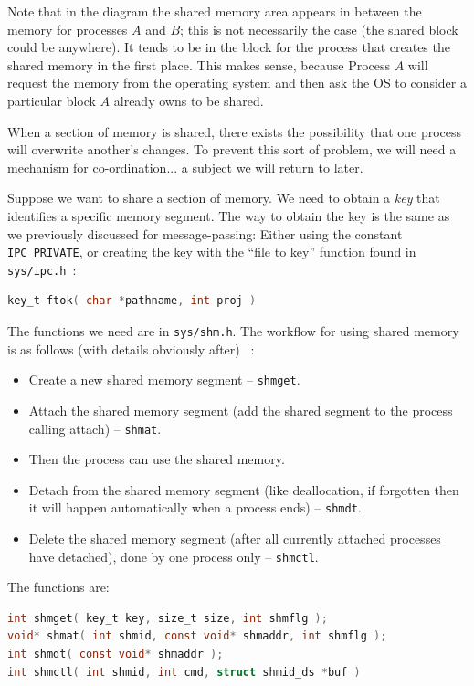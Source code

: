 Note that in the diagram the shared memory area appears in between the memory for processes $A$ and $B$; this is not necessarily the case (the shared block could be anywhere). It tends to be in the block for the process that creates the shared memory in the first place. This makes sense, because Process $A$ will request the memory from the operating system and then ask the OS to consider a particular block $A$ already owns to be shared.

When a section of memory is shared, there exists the possibility that one process will overwrite another's changes. To prevent this sort of problem, we will need a mechanism for co-ordination... a subject we will return to later.

Suppose we want to share a section of memory. We need to obtain a \textit{key} that identifies a specific memory segment. The way to obtain the key is the same as we previously discussed for message-passing: Either using the constant \texttt{IPC\_PRIVATE}, or creating the key with the ``file to key'' function found in \texttt{sys/ipc.h}~\cite{lpi}:
\begin{lstlisting}[language=C]
key_t ftok( char *pathname, int proj )
\end{lstlisting}

The functions we need are in \texttt{sys/shm.h}. The workflow for using shared memory is as follows (with details obviously after) ~\cite{lpi}:
\begin{itemize}
	\item Create a new shared memory segment -- \texttt{shmget}.
	\item Attach the shared memory segment (add the shared segment to the process calling attach) -- \texttt{shmat}.
	\item Then the process can use the shared memory.
	\item Detach from the shared memory segment (like deallocation, if forgotten then it will happen automatically when a process ends) -- \texttt{shmdt}.
	\item Delete the shared memory segment (after all currently attached processes have detached), done by one process only -- \texttt{shmctl}.
\end{itemize}

The functions are:

\begin{lstlisting}[language=C]
int shmget( key_t key, size_t size, int shmflg );
void* shmat( int shmid, const void* shmaddr, int shmflg );
int shmdt( const void* shmaddr );
int shmctl( int shmid, int cmd, struct shmid_ds *buf )
\end{lstlisting}

